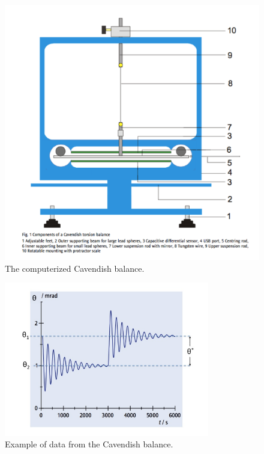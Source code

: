 \begin{figure}
	\centering
	\includegraphics[width=\textwidth]{cavendish/tel-rp2111-setup}
	\caption{The computerized Cavendish balance.}\label{cav:fig:comp-setup}
\end{figure}

\begin{figure}
	\centering
	\includegraphics[width=0.8\textwidth]{cavendish/tel-rp2111-example-data}
	\caption{Example of data from the Cavendish balance.}\label{cav:fig:data}
\end{figure}

